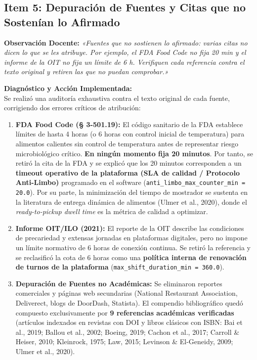 \documentclass[11pt,letterpaper]{article}
\begin{document}
\subsection{Item 5: Depuración de Fuentes y Citas que no Sostenían lo Afirmado}
\noindent \textbf{Observación Docente:} \textit{«Fuentes que no sostienen lo afirmado: varias citas no dicen lo que se les atribuye. Por ejemplo, el FDA Food Code no fija 20 min y el informe de la OIT no fija un límite de 6 h. Verifiquen cada referencia contra el texto original y retiren las que no puedan comprobar.»}

\vspace{0.4em}
\noindent \textbf{Diagnóstico y Acción Implementada:} \\
Se realizó una auditoría exhaustiva contra el texto original de cada fuente, corrigiendo dos errores críticos de atribución:
\begin{enumerate}[leftmargin=1.5em, itemsep=0.2em]
    \item \textbf{FDA Food Code (§ 3-501.19):} El código sanitario de la FDA establece límites de hasta 4 horas (o 6 horas con control inicial de temperatura) para alimentos calientes sin control de temperatura antes de representar riesgo microbiológico crítico. \textbf{En ningún momento fija 20 minutos}. Por tanto, se retiró la cita de la FDA y se explicó que los 20 minutos corresponden a un \textbf{timeout operativo de la plataforma (SLA de calidad / Protocolo Anti-Limbo)} programado en el software (\texttt{anti\_limbo\_max\_counter\_min = 20.0}). Por su parte, la minimización del tiempo de mostrador se sustenta en la literatura de entrega dinámica de alimentos (Ulmer et al., 2020), donde el \textit{ready-to-pickup dwell time} es la métrica de calidad a optimizar.
    \item \textbf{Informe OIT/ILO (2021):} El reporte de la OIT describe las condiciones de precariedad y extensas jornadas en plataformas digitales, pero no impone un límite normativo de 6 horas de conexión continua. Se retiró la referencia y se reclasificó la cota de 6 horas como una \textbf{política interna de renovación de turnos de la plataforma} (\texttt{max\_shift\_duration\_min = 360.0}).
    \item \textbf{Depuración de Fuentes no Académicas:} Se eliminaron reportes comerciales y páginas web secundarias (National Restaurant Association, Deliverect, blogs de DoorDash, Statista). El compendio bibliográfico quedó compuesto exclusivamente por \textbf{9 referencias académicas verificadas} (artículos indexados en revistas con DOI y libros clásicos con ISBN: Bai et al., 2019; Ballou et al., 2002; Boeing, 2019; Cachon et al., 2017; Carroll \& Heiser, 2010; Kleinrock, 1975; Law, 2015; Levinson \& El-Geneidy, 2009; Ulmer et al., 2020).
\end{enumerate}
\end{document}
